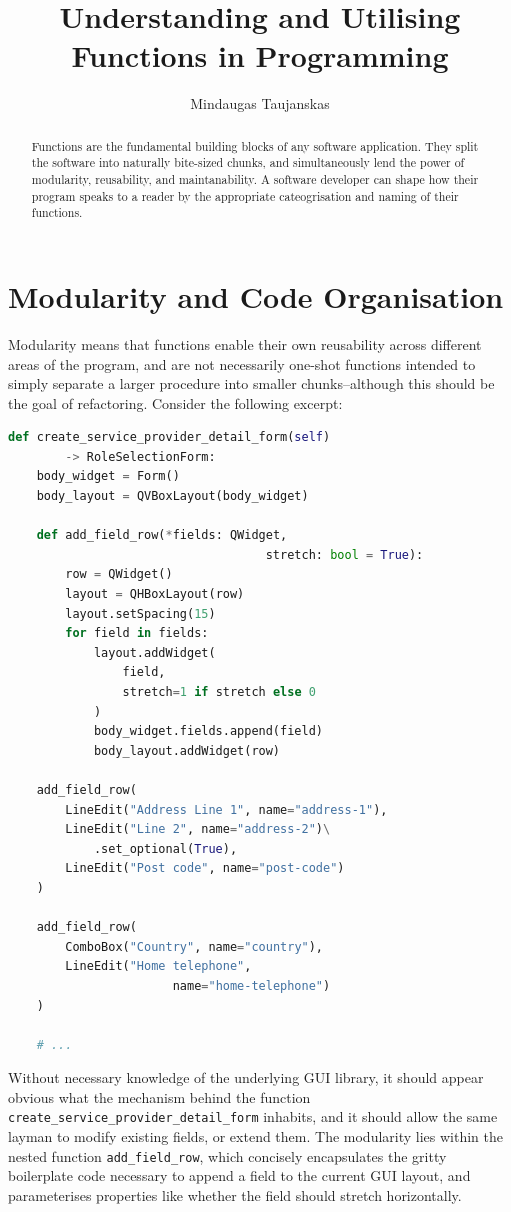 \documentclass[journal]{IEEEtran}
\begin{document}
	
	\title{Understanding and Utilising Functions in Programming}
	
	\author{Mindaugas Taujanskas}
	
	\maketitle
	
	\begin{abstract}
		Functions are the fundamental building blocks of any software application. They split the software into naturally bite-sized chunks, and simultaneously lend the power of modularity, reusability, and maintanability. A software developer can shape how their program speaks to a reader by the appropriate cateogrisation and naming of their functions.
	\end{abstract}
	
	\section{Modularity and Code Organisation}
	Modularity means that functions enable their own reusability across different areas of the program, and are not necessarily one-shot functions intended to simply separate a larger procedure into smaller chunks--although this should be the goal of refactoring. Consider the following excerpt:
	
	\begin{lstlisting}[language=Python]
def create_service_provider_detail_form(self)
		-> RoleSelectionForm:
	body_widget = Form()
	body_layout = QVBoxLayout(body_widget)
	
	def add_field_row(*fields: QWidget,
								    stretch: bool = True):
		row = QWidget()
		layout = QHBoxLayout(row)
		layout.setSpacing(15)
		for field in fields:
			layout.addWidget(
				field,
				stretch=1 if stretch else 0
			)
			body_widget.fields.append(field)
			body_layout.addWidget(row)

	add_field_row(
		LineEdit("Address Line 1", name="address-1"),
		LineEdit("Line 2", name="address-2")\
			.set_optional(True),
		LineEdit("Post code", name="post-code")
	)
	
	add_field_row(
		ComboBox("Country", name="country"),
		LineEdit("Home telephone",
					   name="home-telephone")
	)
	
	# ...
	\end{lstlisting}

	Without necessary knowledge of the underlying GUI library, it should appear obvious what the mechanism behind the function \lstinline|create_service_provider_detail_form| inhabits, and it should allow the same layman to modify existing fields, or extend them. The modularity lies within the nested function \lstinline|add_field_row|, which concisely encapsulates the gritty boilerplate code necessary to append a field to the current GUI layout, and parameterises properties like whether the field should stretch horizontally.
	
\end{document}
